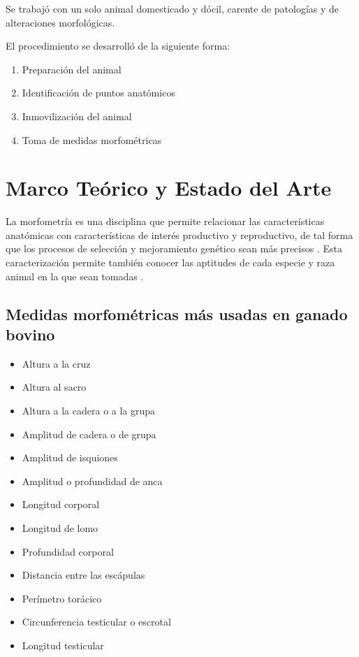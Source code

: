 \documentclass[
]{book}
\providecommand{\tightlist}{%
  \setlength{\itemsep}{0pt}\setlength{\parskip}{0pt}}
\begin{document}
Se trabajó con un solo animal domesticado y dócil, carente de patologías y de alteraciones morfológicas.

El procedimiento se desarrolló de la siguiente forma:

\begin{enumerate}
\def\labelenumi{\arabic{enumi}.}
\tightlist
\item
  Preparación del animal
\item
  Identificación de puntos anatómicos
\item
  Inmovilización del animal
\item
  Toma de medidas morfométricas
\end{enumerate}

\chapter{Marco Teórico y Estado del Arte}\label{marco-teuxf3rico-y-estado-del-arte}

La morfometría es una disciplina que permite relacionar las características anatómicas con características de interés productivo y reproductivo, de tal forma que los procesos de selección y mejoramiento genético sean más precisos \citep{Medina2005}. Esta caracterización permite también conocer las aptitudes de cada especie y raza animal en la que sean tomadas \citep{Gonzalez2021}.

\section{Medidas morfométricas más usadas en ganado bovino}\label{medidas-morfomuxe9tricas-muxe1s-usadas-en-ganado-bovino}

\begin{itemize}
\tightlist
\item
  Altura a la cruz
\item
  Altura al sacro
\item
  Altura a la cadera o a la grupa
\item
  Amplitud de cadera o de grupa
\item
  Amplitud de isquiones
\item
  Amplitud o profundidad de anca
\item
  Longitud corporal
\item
  Longitud de lomo
\item
  Profundidad corporal
\item
  Distancia entre las escápulas
\item
  Perímetro torácico
\item
  Circunferencia testicular o escrotal
\item
  Longitud testicular
\end{itemize}
\end{document}
